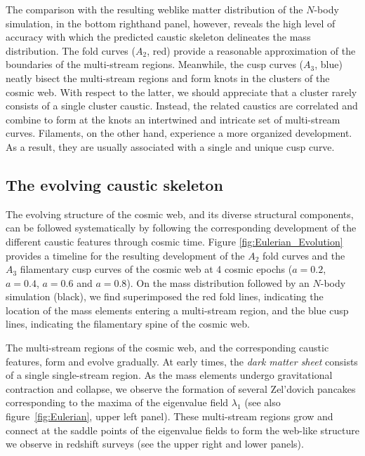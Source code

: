 \documentclass[a4paper, 11pt]{article}
\begin{document}
The comparison with the resulting weblike matter distribution of the $N$-body simulation, in the bottom righthand panel, however, reveals the high level of accuracy with which the predicted caustic skeleton delineates the mass distribution. The fold curves ($A_2$, red) provide a reasonable approximation of the boundaries of the multi-stream regions. Meanwhile, the cusp curves ($A_3$, blue) neatly bisect the multi-stream regions and form knots in the clusters of the cosmic web. With respect to the latter, we should appreciate that a cluster rarely consists of a single cluster caustic. Instead, the related caustics are correlated and combine to form at the knots an intertwined and intricate set of multi-stream curves. Filaments, on the other hand, experience a more organized development. As a result, they are usually associated with a single and unique cusp curve. 

\subsection{The evolving caustic skeleton}
The evolving structure of the cosmic web, and its diverse structural components, can be followed systematically by following the corresponding development of the different caustic features through cosmic time. Figure \ref{fig:Eulerian_Evolution} provides a timeline for the resulting development of the $A_2$ fold curves and the $A_3$ filamentary cusp curves of the cosmic web at 4 cosmic epochs ($a=0.2$, $a=0.4$, $a=0.6$ and $a=0.8$). On the mass distribution followed by an $N$-body simulation (black), we find superimposed the red fold lines, indicating the location of the mass elements entering a multi-stream region, and the blue cusp lines, indicating the filamentary spine of the cosmic web. 

The multi-stream regions of the cosmic web, and the corresponding caustic features, form and evolve gradually. At early times, the {\it dark matter sheet} consists of a single single-stream region. As the mass elements undergo gravitational contraction and collapse, we observe the formation of several Zel'dovich pancakes corresponding to the maxima of the eigenvalue field $\lambda_1$ (see also figure~\ref{fig:Eulerian}, upper left panel). These multi-stream regions grow and connect at the saddle points of the eigenvalue fields to form the web-like structure we observe in redshift surveys (see the upper right and lower panels).
\end{document}
